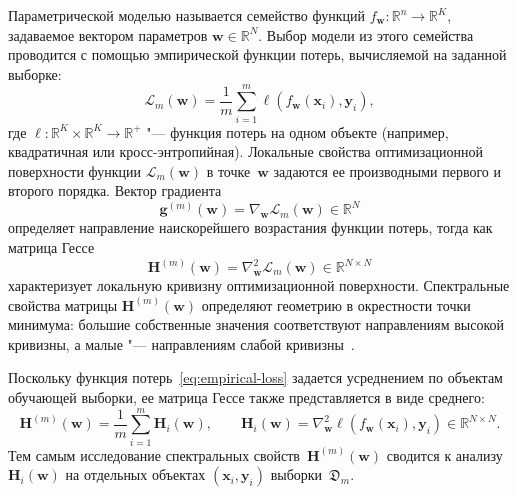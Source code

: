 Параметрической моделью называется семейство функций $f_{\mathbf{w}}: \mathbb{R}^{n} \to \mathbb{R}^{K}$, задаваемое вектором параметров $\mathbf{w} \in \mathbb{R}^{N}$. Выбор модели из этого семейства проводится с помощью эмпирической функции потерь, вычисляемой на заданной выборке: 
\begin{equation}
\label{eq:empirical-loss}
\mathcal{L}_m(\mathbf{w}) = \frac{1}{m} \sum_{i=1}^m \ell(f_{\mathbf{w}}(\mathbf{x}_i), \mathbf{y}_i),
\end{equation}
где $\ell: \mathbb{R}^{K} \times \mathbb{R}^{K} \to \mathbb{R}^+$ "--- функция потерь на одном объекте (например, квадратичная или кросс-энтропийная). Локальные свойства оптимизационной поверхности функции $\mathcal{L}_m(\mathbf{w})$ в точке~$\mathbf{w}$ задаются ее производными первого и второго порядка. Вектор градиента
\begin{equation}
    \label{eq:gradient}
    \mathbf{g}^{(m)}(\mathbf{w}) = \nabla_{\mathbf{w}} \mathcal{L}_m(\mathbf{w}) \in \mathbb{R}^{N}
\end{equation}
определяет направление наискорейшего возрастания функции потерь, тогда как матрица Гессе
\begin{equation}
    \label{eq:hessian}
    \mathbf{H}^{(m)}(\mathbf{w}) = \nabla_{\mathbf{w}}^2 \mathcal{L}_m(\mathbf{w}) \in \mathbb{R}^{N \times N}
\end{equation}
характеризует локальную кривизну оптимизационной поверхности. Спектральные свойства матрицы $\mathbf{H}^{(m)}(\mathbf{w})$ определяют геометрию в окрестности точки минимума: большие собственные значения соответствуют направлениям высокой кривизны, а малые "--- направлениям слабой кривизны~\cite{hochreiter1997flat,dauphin2014,li2018visualizing,arjevani2020analytic}.

Поскольку функция потерь~\eqref{eq:empirical-loss} задается усреднением по объектам обучающей выборки, ее матрица Гессе также представляется в виде среднего:
\begin{equation}
    \label{eq:hessian-mean}
    \mathbf{H}^{(m)}(\mathbf{w}) = \frac{1}{m}\sum_{i=1}^m \mathbf{H}_i(\mathbf{w}),
    \qquad
    \mathbf{H}_i(\mathbf{w}) = \nabla_{\mathbf{w}}^2 \ell\left(f_{\mathbf{w}}(\mathbf{x}_i), \mathbf{y}_i\right) \in \mathbb{R}^{N \times N}.
\end{equation}
Тем самым исследование спектральных свойств~$\mathbf{H}^{(m)}(\mathbf{w})$ сводится к анализу~$\mathbf{H}_i(\mathbf{w})$ на отдельных объектах $(\mathbf{x}_i, \mathbf{y}_i)$ выборки~$\mathfrak{D}_{m}$.

